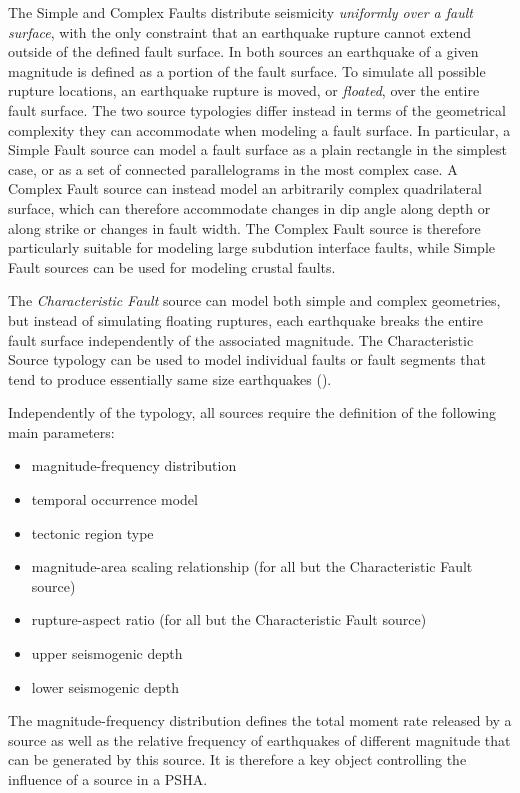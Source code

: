 The Simple and Complex Faults distribute seismicity \textit{uniformly over a
fault surface}, with the only constraint that an earthquake rupture cannot
extend outside of the defined fault surface. In both sources an earthquake of a
given magnitude is defined as a portion of the fault surface. 
%
To simulate all possible rupture locations, an earthquake rupture is moved, or
\textit{floated}, over the entire fault surface. The two source typologies
differ instead in terms of the geometrical complexity they can accommodate when
modeling a fault surface. In particular, a Simple Fault source can model a fault
surface as a plain rectangle in the simplest case, or as a set of connected
parallelograms in the most complex case. 
%
A Complex Fault source can instead model an arbitrarily complex
quadrilateral surface, which can therefore accommodate changes in dip angle
along depth or along strike or changes in fault width. The Complex Fault source
is therefore particularly suitable for modeling large subdution interface
faults, while Simple Fault sources can be used for modeling crustal faults. 

The \textit{Characteristic Fault} source can model both simple and complex
geometries, but instead of simulating floating ruptures, each earthquake breaks
the entire fault surface independently of the associated magnitude. The
Characteristic Source typology can be used to model individual faults or fault
segments that tend to produce essentially same size earthquakes
(\cite{schwartscoppersmith1984}).

Independently of the typology, all sources require the definition of the
following main parameters:
\begin{itemize}
\item magnitude-frequency distribution
\item temporal occurrence model
\item tectonic region type
\item magnitude-area scaling relationship (for all but the Characteristic Fault source)
\item rupture-aspect ratio (for all but the Characteristic Fault source)
\item upper seismogenic depth
\item lower seismogenic depth
\end{itemize}
%
The magnitude-frequency distribution defines the total moment rate released by a
source as well as the relative frequency of earthquakes of different magnitude
that can be generated by this source. It is therefore a key object
controlling the influence of a source in a PSHA. 

